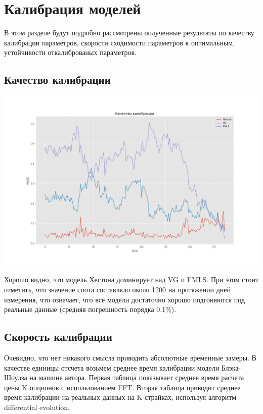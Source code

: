 \documentclass[oneside, final, 12pt]{article}
\begin{document}
\newpage
\section{Калибрация моделей}
В этом разделе будут подробно рассмотрены полученные результаты по качеству калибрации параметров, скорости сходимости параметров к оптимальным, устойчивости откалиброваных параметров. 

\subsection{Качество калибрации}

\begin{center}
  \includegraphics[width=1\linewidth]{img/RMSE_quality.png}
\end{center}

Хорошо видно, что модель Хестона доминирует над VG и FMLS. При этом стоит отметить, что значение спота составляло около 1200 на протяжении дней измерения, что означает, что все модели достаточно хорошо подгоняются под реальные данные (средняя погрешность порядка 0.1\%).

\newpage
\subsection{Скорость калибрации}
Очевидно, что нет никакого смысла приводить абсолютные временные замеры. В качестве единицы отсчета возьмем среднее время калибрации модели Блэка-Шоулза на машине автора. Первая таблица показывает среднее время расчета цены K опционов с использованием FFT\cite{FFT:paper}. Вторая таблица приводит среднее время калибрации на реальных данных на K страйках, используя алгоритм differential evolution\cite{DE:paper1}.
\end{document}
